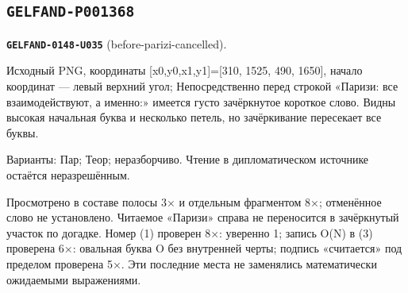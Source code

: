 \documentclass[11pt]{article}
\theoremstyle{definition}
\theoremstyle{remark}
\begin{document}
\subsection*{\texttt{GELFAND-P001368}}
\noindent\leavevmode{}\label{GELFAND-P001368:before-parizi-cancelled:note}\textbf{\texttt{GELFAND-0148-U035}} (before-parizi-cancelled).\par\nopagebreak[4]
Исходный PNG, координаты [x0,y0,x1,y1]=[310, 1525, 490, 1650], начало координат — левый верхний угол; Непосредственно перед строкой «Паризи: все взаимодействуют, а именно:» имеется густо зачёркнутое короткое слово. Видны высокая начальная буква и несколько петель, но зачёркивание пересекает все буквы.\par
Варианты: Пар; Теор; неразборчиво. Чтение в дипломатическом источнике остаётся неразрешённым.\par
Просмотрено в составе полосы 3× и отдельным фрагментом 8×; отменённое слово не установлено. Читаемое «Паризи» справа не переносится в зачёркнутый участок по догадке. Номер (1) проверен 8×: уверенно 1; запись O(N) в (3) проверена 6×: овальная буква O без внутренней черты; подпись «считается» под пределом проверена 5×. Эти последние места не заменялись математически ожидаемыми выражениями.\par\medskip
\end{document}
